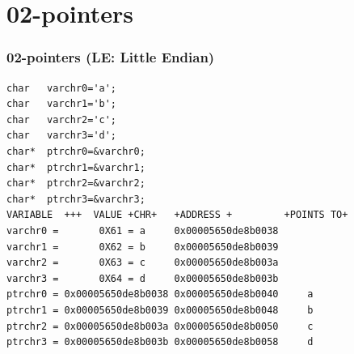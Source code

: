 \documentclass[aspectratio=169, xcolor=table, notheorems, hyperref={pdfpagelabels=false}]{beamer}
\begin{document}
\section{02-pointers}
\begin{frame}[fragile]
\frametitle{02-pointers (LE: Little Endian)}
\begin{lstlisting}[basicstyle=\ttfamily\tiny]
char   varchr0='a';
char   varchr1='b';
char   varchr2='c';
char   varchr3='d';
char*  ptrchr0=&varchr0;
char*  ptrchr1=&varchr1;
char*  ptrchr2=&varchr2;
char*  ptrchr3=&varchr3;
VARIABLE  +++  VALUE +CHR+   +ADDRESS +         +POINTS TO+ 
varchr0 =       0X61 = a     0x00005650de8b0038
varchr1 =       0X62 = b     0x00005650de8b0039
varchr2 =       0X63 = c     0x00005650de8b003a
varchr3 =       0X64 = d     0x00005650de8b003b
ptrchr0 = 0x00005650de8b0038 0x00005650de8b0040     a
ptrchr1 = 0x00005650de8b0039 0x00005650de8b0048     b
ptrchr2 = 0x00005650de8b003a 0x00005650de8b0050     c
ptrchr3 = 0x00005650de8b003b 0x00005650de8b0058     d
\end{lstlisting}

\begin{minipage}[t]{120mm}
\end{minipage}

\end{frame}
\end{document}
